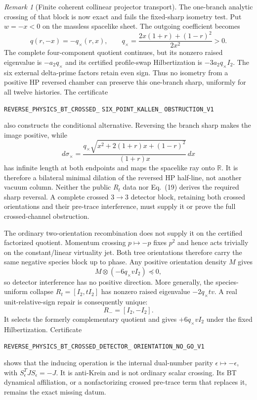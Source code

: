 \documentclass[11pt]{article}
\theoremstyle{definition}
\theoremstyle{remark}
\newtheorem{remark}[theorem]{Remark}
\begin{document}
\begin{remark}[Finite coherent collinear projector transport]
The one-branch analytic crossing of that block is now exact and fails the
fixed-sharp isometry test.  Put $w=-x<0$ on the massless spacelike sheet.  The
outgoing coefficient becomes
\[
 q(r,-x)=-q_\times(r,x),\qquad
 q_\times=\frac{2x(1+r)+(1-r)^2}{2x^2}>0.
\]
The complete four-component quotient continues, but its nonzero raised
eigenvalue is $-a_2q_\times$ and its certified profile-swap Hilbertization is
$-3a_2q_\times I_2$.  The six external delta-prime factors retain even sign.
Thus no isometry from a positive HP reversed chamber can preserve this
one-branch sharp, uniformly for all twelve histories.  The certificate
\par\noindent
\texttt{REVERSE\_PHYSICS\_BT\_CROSSED\_}
\allowbreak\texttt{SIX\_POINT\_KALLEN\_}
\allowbreak\texttt{OBSTRUCTION\_V1}
\par\noindent
also constructs the conditional alternative.  Reversing the branch sharp
makes the image positive, while
\[
 d\sigma_\times=
 \frac{q_\times\sqrt{x^2+2(1+r)x+(1-r)^2}}{(1+r)x}\,dx
\]
has infinite length at both endpoints and maps the spacelike ray onto
$\mathbb R$.  It is therefore a bilateral minimal dilation of the reversed
HP half-line, not another vacuum column.  Neither the public $R_t$ data nor
Eq.~(19) derives the required sharp reversal.  A complete crossed $3\to3$
detector block, retaining both crossed orientations and their pre-trace
interference, must supply it or prove the full crossed-channel obstruction.

The ordinary two-orientation recombination does not supply it on the certified
factorized quotient.  Momentum crossing $p\mapsto-p$ fixes $p^2$ and hence
acts trivially on the constant/linear virtuality jet.  Both tree orientations
therefore carry the same negative species block up to phase.  Any positive
orientation density $M$ gives
\[
 M\otimes(-6q_\times vI_2)\preceq0,
\]
so detector interference has no positive direction.  More generally, the
species-uniform collapse $R_t=[I_2,tI_2]$ has nonzero raised eigenvalue
$-2q_\times tv$.  A real unit-relative-sign repair is consequently unique:
\[
 R_-=[I_2,-I_2].
\]
It selects the formerly complementary quotient and gives
$+6q_\times vI_2$ under the fixed Hilbertization.  Certificate
\par\noindent
\texttt{REVERSE\_PHYSICS\_BT\_CROSSED\_DETECTOR\_}
\allowbreak\texttt{ORIENTATION\_NO\_GO\_V1}
\par\noindent
shows that the inducing operation is the internal dual-number parity
$\epsilon\mapsto-\epsilon$, with $S_\epsilon^TJS_\epsilon=-J$.  It is
anti-Krein and is not ordinary scalar crossing.  Its BT dynamical affiliation,
or a nonfactorizing crossed pre-trace term that replaces it, remains the exact
missing datum.


\end{remark}
\end{document}
